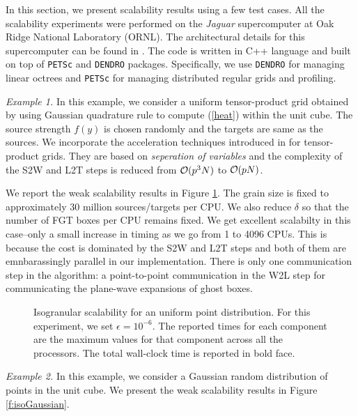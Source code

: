 In this section, we present scalability results using a few test cases.  All the scalability experiments were performed 
on the {\it{Jaguar}} supercomputer at Oak Ridge National Laboratory (ORNL). The architectural details for this supercomputer
 can be found in \cite{jaguar}. The code is written in C++ language and built on top of \texttt{PETSc} and \texttt{DENDRO} packages. 
 Specifically, we use \texttt{DENDRO} for managing linear octrees and \texttt{PETSc} for managing distributed regular grids and profiling. 


{\em Example 1.} In this example, we consider a uniform tensor-product grid obtained by using Gaussian quadrature rule to compute (\ref{heat}) within the unit cube. The source strength $f(y)$ is chosen randomly and the targets are same as the sources. We incorporate the acceleration techniques introduced in \cite{fggt} for tensor-product grids. They are based on 
{\em seperation of variables} and the complexity of the S2W and L2T steps is reduced from $\mathcal{O}(p^3 N)$ to $\mathcal{O}(p N)$. 

We report the weak scalability results in Figure \ref{f:isoUniform}. The grain size is fixed to approximately 30 million sources/targets per CPU. We also reduce $\delta$ so that the number of FGT boxes per CPU remains fixed. We get excellent scalabilty in this case--only a small increase in timing as we go from 1 to 4096 CPUs. This is  because the cost is dominated by the S2W and L2T steps and both of them are emnbarassingly parallel in our implementation. There is only one communication step in the algorithm: a point-to-point communication in the W2L step for communicating the plane-wave expansions of ghost boxes.

\begin{figure}
	\begin{center}
	
	\end{center}
\caption{\label{f:isoUniform} Isogranular scalability for an uniform point distribution. For
 this experiment, we set $\epsilon = 10^{-6}$. The reported times for 
each component are the maximum values for that component across all the processors. The total wall-clock
time is reported in bold face.} 
\end{figure}

{\em Example 2.} In this example, we consider a Gaussian random distribution of points in the unit cube. 
We present the weak scalability results in Figure \ref{f:isoGaussian}. 

